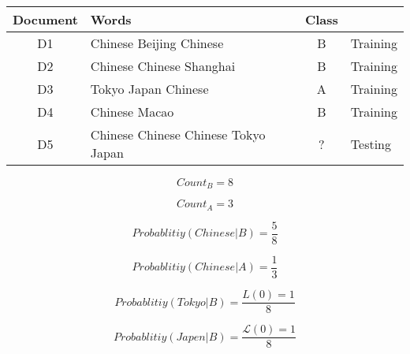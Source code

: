 \begin{tabular}{||c l c l|}
\hline
Document&	Words	& 	Class	&	\\
\hline
\hline
D1	&	Chinese Beijing Chinese	& 	B	&	Training \\
D2	&	Chinese Chinese	Shanghai& 	B	&	Training \\
D3	&	Tokyo Japan Chinese	& 	A	&	Training \\
D4	&	Chinese Macao		& 	B	&	Training \\
	D5	&	Chinese Chinese Chinese Tokyo Japan 	& 	? & Testing		\\
\hline
\end{tabular}
\linebreak
\begin{center}
\begin{equation}
	Count_B = 8
\end{equation}

\begin{equation}
	Count_A = 3
\end{equation}

\begin{equation}
	Probablitiy(Chinese|B) = \frac{5}{8} 
\end{equation}

\begin{equation}
	Probablitiy(Chinese|A) = \frac{1}{3} 
\end{equation}

\begin{equation}
	Probablitiy(Tokyo|B) = \frac{{L}(0)=1}{8} 
\end{equation}

\begin{equation}
	Probablitiy(Japen|B) = \frac{\mathcal{L}(0)=1}{8} 
\end{equation}
\end{center}
